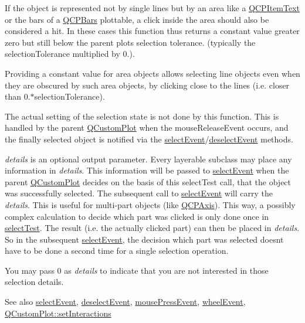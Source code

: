If the object is represented not by single lines but by an area like a \hyperlink{class_q_c_p_item_text}{Q\+C\+P\+Item\+Text} or the bars of a \hyperlink{class_q_c_p_bars}{Q\+C\+P\+Bars} plottable, a click inside the area should also be considered a hit. In these cases this function thus returns a constant value greater zero but still below the parent plot\textquotesingle{}s selection tolerance. (typically the selection\+Tolerance multiplied by 0.).

Providing a constant value for area objects allows selecting line objects even when they are obscured by such area objects, by clicking close to the lines (i.\+e. closer than 0.$\ast$selection\+Tolerance).

The actual setting of the selection state is not done by this function. This is handled by the parent \hyperlink{class_q_custom_plot}{Q\+Custom\+Plot} when the mouse\+Release\+Event occurs, and the finally selected object is notified via the \hyperlink{class_q_c_p_abstract_item_aa4b969c58797f39c9c0b6c07c7869d17}{select\+Event}/\hyperlink{class_q_c_p_abstract_item_af9093798cb07a861dcc73f93ca16c0c1}{deselect\+Event} methods.

{\itshape details} is an optional output parameter. Every layerable subclass may place any information in {\itshape details}. This information will be passed to \hyperlink{class_q_c_p_abstract_item_aa4b969c58797f39c9c0b6c07c7869d17}{select\+Event} when the parent \hyperlink{class_q_custom_plot}{Q\+Custom\+Plot} decides on the basis of this select\+Test call, that the object was successfully selected. The subsequent call to \hyperlink{class_q_c_p_abstract_item_aa4b969c58797f39c9c0b6c07c7869d17}{select\+Event} will carry the {\itshape details}. This is useful for multi-\/part objects (like \hyperlink{class_q_c_p_axis}{Q\+C\+P\+Axis}). This way, a possibly complex calculation to decide which part was clicked is only done once in \hyperlink{class_q_c_p_abstract_item_ae41d0349d68bb802c49104afd100ba2a}{select\+Test}. The result (i.\+e. the actually clicked part) can then be placed in {\itshape details}. So in the subsequent \hyperlink{class_q_c_p_abstract_item_aa4b969c58797f39c9c0b6c07c7869d17}{select\+Event}, the decision which part was selected doesn\textquotesingle{}t have to be done a second time for a single selection operation.

You may pass 0 as {\itshape details} to indicate that you are not interested in those selection details.

\begin{DoxySeeAlso}{See also}
\hyperlink{class_q_c_p_abstract_item_aa4b969c58797f39c9c0b6c07c7869d17}{select\+Event}, \hyperlink{class_q_c_p_abstract_item_af9093798cb07a861dcc73f93ca16c0c1}{deselect\+Event}, \hyperlink{class_q_c_p_layerable_af6567604818db90f4fd52822f8bc8376}{mouse\+Press\+Event}, \hyperlink{class_q_c_p_layerable_a47dfd7b8fd99c08ca54e09c362b6f022}{wheel\+Event}, \hyperlink{class_q_custom_plot_a5ee1e2f6ae27419deca53e75907c27e5}{Q\+Custom\+Plot\+::set\+Interactions} 
\end{DoxySeeAlso}



